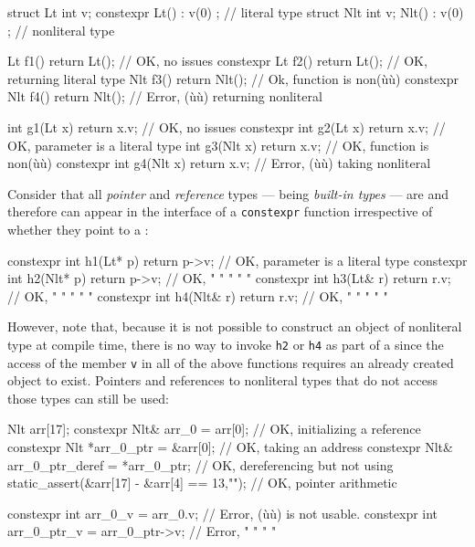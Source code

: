 \begin{emcppslisting}[emcppsbatch=e8]
struct  Lt { int v; constexpr  Lt() : v(0) { } };  // literal type
struct Nlt { int v;           Nlt() : v(0) { } };  // nonliteral type

          Lt  f1() { return Lt();  }  // OK, no issues
constexpr Lt  f2() { return Lt();  }  // OK, returning literal type
          Nlt f3() { return Nlt(); }  // Ok, function is non(ù{}ù)
constexpr Nlt f4() { return Nlt(); }  // Error, (ù{}ù) returning nonliteral

          int g1(Lt  x) { return x.v; }  // OK, no issues
constexpr int g2(Lt  x) { return x.v; }  // OK, parameter is a literal type
          int g3(Nlt x) { return x.v; }  // OK, function is non(ù{}ù)
constexpr int g4(Nlt x) { return x.v; }  // Error, (ù{}ù) taking nonliteral
\end{emcppslisting}
    

\noindent Consider that all \emph{pointer} and \emph{reference} types --- being
\emph{built-in types} --- are  and therefore can
appear in the interface of a \lstinline!constexpr! function irrespective of
whether they point to a :

\begin{emcppslisting}[emcppsbatch=e8]
constexpr int h1(Lt*  p) { return p->v; }  // OK, parameter is a literal type
constexpr int h2(Nlt* p) { return p->v; }  // OK,    "      "  "    "      "
constexpr int h3(Lt&  r) { return r.v; }   // OK,    "      "  "    "      "
constexpr int h4(Nlt& r) { return r.v; }   // OK,    "      "  "    "      "
\end{emcppslisting}
    

\noindent However, note that, because it is not possible to construct an object of
nonliteral type at compile time, there is no way to invoke \lstinline!h2!
or \lstinline!h4! as part of a  since the
access of the member \lstinline!v! in all of the above functions requires
an already created object to exist. Pointers and references to
nonliteral types that do not access those types can still be used:

\begin{emcppslisting}[emcppsbatch=e8]
Nlt arr[17];
constexpr Nlt& arr_0 = arr[0];                // OK, initializing a reference
constexpr Nlt *arr_0_ptr = &arr[0];           // OK, taking an address
constexpr Nlt& arr_0_ptr_deref = *arr_0_ptr;  // OK, dereferencing but not using
static_assert(&arr[17] - &arr[4] == 13,"");   // OK, pointer arithmetic

constexpr int arr_0_v = arr_0.v;              // Error, (ù{}ù) is not usable.
constexpr int arr_0_ptr_v = arr_0_ptr->v;     // Error,    "     "   "    "
\end{emcppslisting}
    

